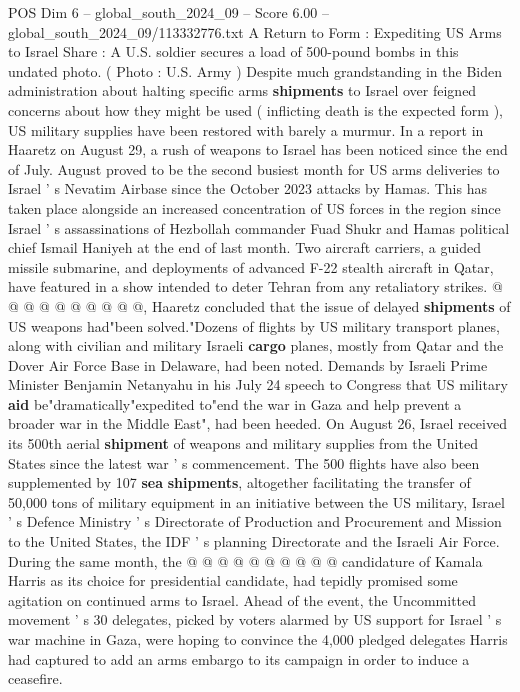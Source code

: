 \begin{textsample}{POS Dim 6 – global\_south\_2024\_09 – Score 6.00 – global\_south\_2024\_09/113332776.txt}  \label{ex:f6_pos_432}
A Return to Form : Expediting US Arms to Israel Share : A U.S. soldier secures a load of 500-pound bombs in this undated photo. ( Photo : U.S.
Army ) Despite much grandstanding in the Biden administration about halting specific arms \textbf{shipments} to Israel over feigned concerns about how they might be used ( inflicting death is the expected form ), US military supplies have been restored with barely a murmur.
In a report in Haaretz on August 29, a rush of weapons to Israel has been noticed since the end of July.
August proved to be the second busiest month for US arms deliveries to Israel ' s Nevatim Airbase since the October 2023 attacks by Hamas.
This has taken place alongside an increased concentration of US forces in the region since Israel ' s assassinations of Hezbollah commander Fuad Shukr and Hamas political chief Ismail Haniyeh at the end of last month.
Two aircraft carriers, a guided missile submarine, and deployments of advanced F-22 stealth aircraft in Qatar, have featured in a show intended to deter Tehran from any retaliatory strikes. @ @ @ @ @ @ @ @ @ @, Haaretz concluded that the issue of delayed \textbf{shipments} of US weapons had"been solved."Dozens of flights by US military transport planes, along with civilian and military Israeli \textbf{cargo} planes, mostly from Qatar and the Dover Air Force Base in Delaware, had been noted.
Demands by Israeli Prime Minister Benjamin Netanyahu in his July 24 speech to Congress that US military \textbf{aid} be"dramatically"expedited to"end the war in Gaza and help prevent a broader war in the Middle East", had been heeded.
On August 26, Israel received its 500th aerial \textbf{shipment} of weapons and military supplies from the United States since the latest war ' s commencement.
The 500 flights have also been supplemented by 107 \textbf{sea} \textbf{shipments}, altogether facilitating the transfer of 50,000 tons of military equipment in an initiative between the US military, Israel ' s Defence Ministry ' s Directorate of Production and Procurement and Mission to the United States, the IDF ' s planning Directorate and the Israeli Air Force.
During the same month, the @ @ @ @ @ @ @ @ @ @ candidature of Kamala Harris as its choice for presidential candidate, had tepidly promised some agitation on continued arms to Israel.
Ahead of the event, the Uncommitted movement ' s 30 delegates, picked by voters alarmed by US support for Israel ' s war machine in Gaza, were hoping to convince the 4,000 pledged delegates Harris had captured to add an arms embargo to its campaign in order to induce a ceasefire.

\end{textsample}

